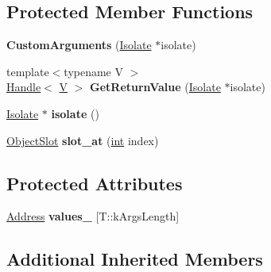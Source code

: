 \subsection*{Protected Member Functions}
\begin{DoxyCompactItemize}
\item 
\mbox{\label{classv8_1_1internal_1_1CustomArguments_a4269b099942f91e5ce1deaff371e1330}} 
{\bfseries Custom\+Arguments} (\mbox{\hyperlink{classv8_1_1internal_1_1Isolate}{Isolate}} $\ast$isolate)
\item 
\mbox{\label{classv8_1_1internal_1_1CustomArguments_ac12aff15a5c0df261941c81c22ce7a54}} 
{\footnotesize template$<$typename V $>$ }\\\mbox{\hyperlink{classv8_1_1internal_1_1Handle}{Handle}}$<$ \mbox{\hyperlink{classV}{V}} $>$ {\bfseries Get\+Return\+Value} (\mbox{\hyperlink{classv8_1_1internal_1_1Isolate}{Isolate}} $\ast$isolate)
\item 
\mbox{\label{classv8_1_1internal_1_1CustomArguments_a144347b17b87f729468c79c88a0b7686}} 
\mbox{\hyperlink{classv8_1_1internal_1_1Isolate}{Isolate}} $\ast$ {\bfseries isolate} ()
\item 
\mbox{\label{classv8_1_1internal_1_1CustomArguments_aae680f9b27fb204562bdc27a66becf09}} 
\mbox{\hyperlink{classv8_1_1internal_1_1ObjectSlot}{Object\+Slot}} {\bfseries slot\+\_\+at} (\mbox{\hyperlink{classint}{int}} index)
\end{DoxyCompactItemize}
\subsection*{Protected Attributes}
\begin{DoxyCompactItemize}
\item 
\mbox{\label{classv8_1_1internal_1_1CustomArguments_a21c3b0712977c6170d82e912ddaf5bdc}} 
\mbox{\hyperlink{classuintptr__t}{Address}} {\bfseries values\+\_\+} \mbox{[}T\+::k\+Args\+Length\mbox{]}
\end{DoxyCompactItemize}
\subsection*{Additional Inherited Members}


